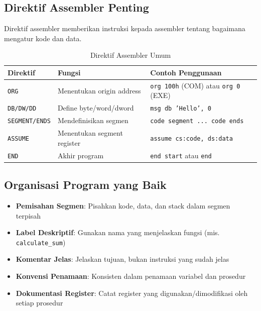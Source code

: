 \documentclass[../main.tex]{subfiles}
\begin{document}
        \subsection{Direktif Assembler Penting}
            Direktif assembler memberikan instruksi kepada assembler tentang bagaimana mengatur kode dan data.

            \begin{table}[H]
\centering
\caption{Direktif Assembler Umum}
\begin{tabular}{|p{2.8cm}|p{4.2cm}|p{7cm}|}
    \hline
    \textbf{Direktif} & \textbf{Fungsi} & \textbf{Contoh Penggunaan} \\
    \hline
    \texttt{ORG} & Menentukan origin address & \texttt{org 100h} (COM) atau \texttt{org 0} (EXE) \\
    \hline
    \texttt{DB/DW/DD} & Define byte/word/dword & \texttt{msg db 'Hello', 0} \\
    \hline
    \texttt{SEGMENT/ENDS} & Mendefinisikan segmen & \texttt{code segment ... code ends} \\
    \hline
    \texttt{ASSUME} & Menentukan segment register & \texttt{assume cs:code, ds:data} \\
    \hline
    \texttt{END} & Akhir program & \texttt{end start} atau \texttt{end} \\
    \hline
\end{tabular}
\label{tab:assembly-directives}
            \end{table}

        \subsection{Organisasi Program yang Baik}
            \begin{itemize}
\item \textbf{Pemisahan Segmen}: Pisahkan kode, data, dan stack dalam segmen terpisah
\item \textbf{Label Deskriptif}: Gunakan nama yang menjelaskan fungsi (mis. \texttt{calculate\_sum})
\item \textbf{Komentar Jelas}: Jelaskan tujuan, bukan instruksi yang sudah jelas
\item \textbf{Konvensi Penamaan}: Konsisten dalam penamaan variabel dan prosedur
\item \textbf{Dokumentasi Register}: Catat register yang digunakan/dimodifikasi oleh setiap prosedur
            \end{itemize}
\end{document}
